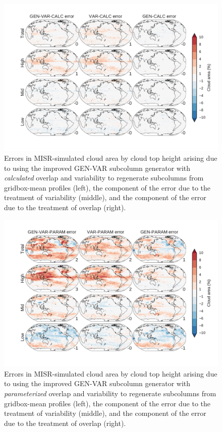 \begin{figure}[htbp]
\centering
\includegraphics{graphics/subgrid2_cldmisr_maps_gen-var-calc_diff.pdf}
\caption{\label{fig:subgrid2_cldmisr_maps_gen-var-calc_diff}Errors in
MISR-simulated cloud area by cloud top height arising due to using the
improved GEN-VAR subcolumn generator with \emph{calculated} overlap and
variability to regenerate subcolumns from gridbox-mean profiles (left),
the component of the error due to the treatment of variability (middle),
and the component of the error due to the treatment of overlap
(right).}\label{fig:subgrid2ux5fcldmisrux5fmapsux5fgen-var-calcux5fdiff}
\end{figure}

\begin{figure}[htbp]
\centering
\includegraphics{graphics/subgrid2_cldmisr_maps_gen-var-param_diff.pdf}
\caption{\label{fig:subgrid2_cldmisr_maps_gen-var-param_diff}Errors in
MISR-simulated cloud area by cloud top height arising due to using the
improved GEN-VAR subcolumn generator with \emph{parameterized} overlap
and variability to regenerate subcolumns from gridbox-mean profiles
(left), the component of the error due to the treatment of variability
(middle), and the component of the error due to the treatment of overlap
(right).}\label{fig:subgrid2ux5fcldmisrux5fmapsux5fgen-var-paramux5fdiff}
\end{figure}

